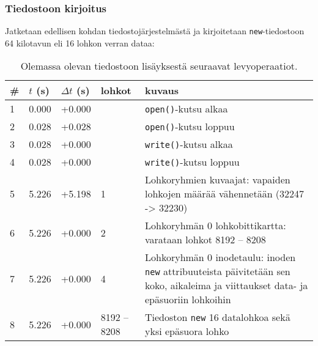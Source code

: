 \subsubsection{Tiedostoon kirjoitus}
\label{ChapExt2FileWrite}
Jatketaan edellisen kohdan tiedostojärjestelmästä ja kirjoitetaan \texttt{new}-tiedostoon 64 kilotavun eli 16 lohkon verran dataa:
\begin{table}[H]
\begin{tabular}{l | l | l | l | p{7cm}}
    \# & $t$ (s) & $\Delta t$ (s) & lohkot & kuvaus \\ \hline \hline
    1  & 0.000    & +0.000   &            & \texttt{open()}-kutsu alkaa    \\ \hline %
    2  & 0.028    & +0.028   &            & \texttt{open()}-kutsu loppuu   \\ \hline %
    3  & 0.028    & +0.000   &            & \texttt{write()}-kutsu alkaa   \\ \hline %
    4  & 0.028    & +0.000   &            & \texttt{write()}-kutsu loppuu  \\ \hline %
    5  & 5.226    & +5.198   & 1          & Lohkoryhmien kuvaajat: vapaiden lohkojen määrää vähennetään (32247 -> 32230)                             \\ \hline %
    6  & 5.226    & +0.000   & 2          & Lohkoryhmän 0 lohkobittikartta: varataan lohkot 8192 -- 8208         \\ \hline %
    7  & 5.226    & +0.000   & 4          & Lohkoryhmän 0 inodetaulu: inoden \texttt{new} attribuuteista päivitetään sen koko, aikaleima ja viittaukset data- ja epäsuoriin lohkoihin               \\ \hline %
    8  & 5.226    & +0.000   & 8192 -- 8208 & Tiedoston \texttt{new} 16 datalohkoa sekä yksi epäsuora lohko                            \\        %
\end{tabular}
\caption{Olemassa olevan tiedostoon lisäyksestä seuraavat levyoperaatiot.}
\end{table}

